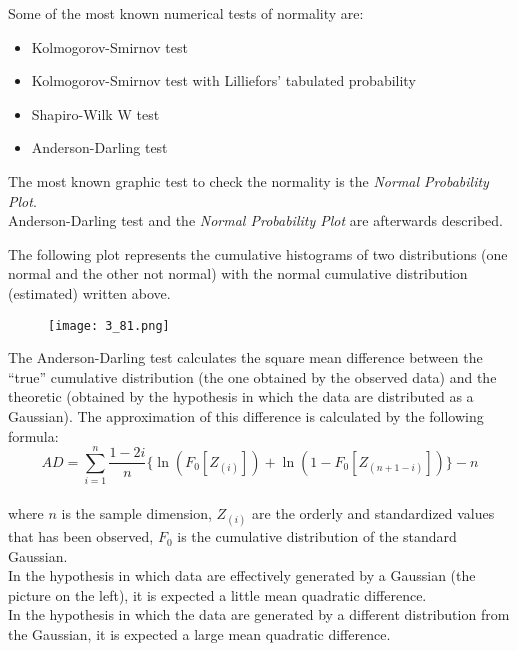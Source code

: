 \begin{frame}
  \vspace*{.25cm}
  Some of the most known numerical tests of normality are:
  \begin{itemize}
    \item Kolmogorov-Smirnov test
    \item Kolmogorov-Smirnov test with Lilliefors' tabulated probability
    \item Shapiro-Wilk W test
    \item Anderson-Darling test
  \end{itemize}
  \vspace*{.25cm}
  The most known graphic test to check the normality is the \textit{Normal Probability Plot}.\\
  \vspace*{.25cm}
  Anderson-Darling test and the \textit{Normal Probability Plot} are afterwards described. 
\end{frame}


\begin{frame}
  \vspace*{.25cm}
  The following plot represents the cumulative histograms of two distributions (one normal and the other not normal) with the normal cumulative distribution (estimated) written above.
  \begin{figure}
    \texttt{[image: 3\_81.png]}
  \end{figure}
\end{frame}

\begin{frame}
  \begin{small}
    \vspace*{.25cm}
    The Anderson-Darling test calculates the square mean difference between the ``true'' cumulative distribution (the one obtained by the observed data) and the theoretic (obtained by the hypothesis in which the data are distributed as a Gaussian). The approximation of this difference is calculated by the following formula:\\
    \vspace*{.25cm}
    $$ AD = \sum_{i=1}^n {\frac{1-2i}{n}}\{\ln(F_0[Z_{(i)}])+\ln(1-F_0[Z_{(n+1-i)}])\} - n $$\\
    \vspace*{.25cm}
    where $ n $ is the sample dimension, $ Z_{(i)} $ are the orderly and standardized values that has been observed, $ F_0 $ is the cumulative distribution of the standard Gaussian.\\
  \vspace*{.25cm}
  In the hypothesis in which data are effectively generated by a Gaussian (the picture on the left), it is expected a little mean quadratic difference.\\
  In the hypothesis in which the data are generated by a different distribution from the Gaussian, it is expected a large mean quadratic difference.                                                                                                                                               \end{small}
\end{frame}

